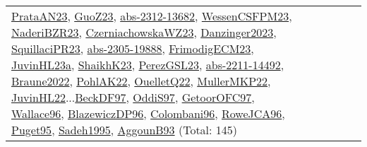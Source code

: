 {\begin{longtable}{p{3cm}r>{\raggedright\arraybackslash}p{6cm}>{\raggedright\arraybackslash}p{6cm}>{\raggedright\arraybackslash}p{8cm}}
\hyperref[detail:PrataAN23]{PrataAN23}, \hyperref[detail:GuoZ23]{GuoZ23}, \hyperref[detail:abs-2312-13682]{abs-2312-13682}, \hyperref[detail:WessenCSFPM23]{WessenCSFPM23}, \hyperref[detail:NaderiBZR23]{NaderiBZR23}, \hyperref[detail:CzerniachowskaWZ23]{CzerniachowskaWZ23}, \hyperref[detail:Danzinger2023]{Danzinger2023}, \hyperref[detail:SquillaciPR23]{SquillaciPR23}, \hyperref[detail:abs-2305-19888]{abs-2305-19888}, \hyperref[detail:FrimodigECM23]{FrimodigECM23}, \hyperref[detail:JuvinHL23a]{JuvinHL23a}, \hyperref[detail:ShaikhK23]{ShaikhK23}, \hyperref[detail:PerezGSL23]{PerezGSL23}, \hyperref[detail:abs-2211-14492]{abs-2211-14492}, \hyperref[detail:Braune2022]{Braune2022}, \hyperref[detail:PohlAK22]{PohlAK22}, \hyperref[detail:OuelletQ22]{OuelletQ22}, \hyperref[detail:MullerMKP22]{MullerMKP22}, \hyperref[detail:JuvinHL22]{JuvinHL22}...\hyperref[detail:BeckDF97]{BeckDF97}, \hyperref[detail:OddiS97]{OddiS97}, \hyperref[detail:GetoorOFC97]{GetoorOFC97}, \hyperref[detail:Wallace96]{Wallace96}, \hyperref[detail:BlazewiczDP96]{BlazewiczDP96}, \hyperref[detail:Colombani96]{Colombani96}, \hyperref[detail:RoweJCA96]{RoweJCA96}, \hyperref[detail:Puget95]{Puget95}, \hyperref[detail:Sadeh1995]{Sadeh1995}, \hyperref[detail:AggounB93]{AggounB93} (Total: 145)\\

\end{longtable}}
